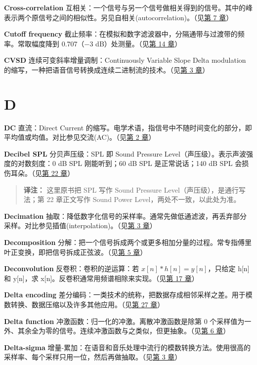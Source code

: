 \textbf{Cross-correlation}
互相关：一个信号与另一个信号做相关得到的信号。其中的峰表示两个原信号之间的相似性。另见自相关(autocorrelation)。（见\hyperref[ch-07]{第
7 章}）

\textbf{Cutoff frequency}
截止频率：在模拟和数字滤波器中，分隔通带与过渡带的频率。常取幅度降到
0.707（−3 dB）处测量。（见\hyperref[ch-14]{第 14 章}）

\textbf{CVSD} 连续可变斜率增量调制：Continuously Variable Slope Delta
modulation
的缩写，一种把语音信号转换成连续二进制流的技术。（见\hyperref[ch-03]{第
3 章}）

\section{D}

\textbf{DC} 直流：Direct Current
的缩写。电学术语，指信号中不随时间变化的部分，即平均值或均值。对比参见交流(AC)。（见\hyperref[ch-02]{第
2 章}）

\textbf{Decibel SPL} 分贝声压级：SPL 即 Sound Pressure
Level（声压级）。表示声波强度的对数刻度：0 dB SPL 刚能听到；60 dB SPL
是正常说话；140 dB SPL 会损伤耳朵。（见\hyperref[ch-22]{第 22 章}）

\begin{quote}
\textbf{译注：} 这里原书把 SPL 写作 Sound Pressure
Level（声压级），是通行写法；第 22 章正文写作 Sound Power
Level，两处不一致，以此处为准。
\end{quote}

\textbf{Decimation}
抽取：降低数字化信号的采样率。通常先做低通滤波，再丢弃部分采样。对比参见插值(interpolation)。（见\hyperref[ch-03]{第
3 章}）

\textbf{Decomposition}
分解：把一个信号拆成两个或更多相加分量的过程。常专指傅里叶正变换，即把信号拆成正弦波。（见\hyperref[ch-05]{第
5 章}）

\textbf{Deconvolution} 反卷积：卷积的逆运算：若
\(x[n] * h[n] = y[n]\)，只给定 h{[}n{]} 和 y{[}n{]}，求
x{[}n{]}。反卷积通常用频谱相除来实现。（见\hyperref[ch-17]{第 17 章}）

\textbf{Delta encoding}
差分编码：一类技术的统称，把数据存成相邻采样之差。用于模数转换、数据压缩以及许多其他应用。（见\hyperref[ch-27]{第
27 章}）

\textbf{Delta function} 冲激函数：归一化的冲激。离散冲激函数是除第 0
个采样值为一外、其余全为零的信号。连续冲激函数与之类似，但更抽象。（见\hyperref[ch-06]{第
6 章}）

\textbf{Delta-sigma}
增量-累加：在语音和音乐处理中流行的模数转换方法。使用很高的采样率、每个采样只用一位，然后再做抽取。（见\hyperref[ch-03]{第
3 章}）

